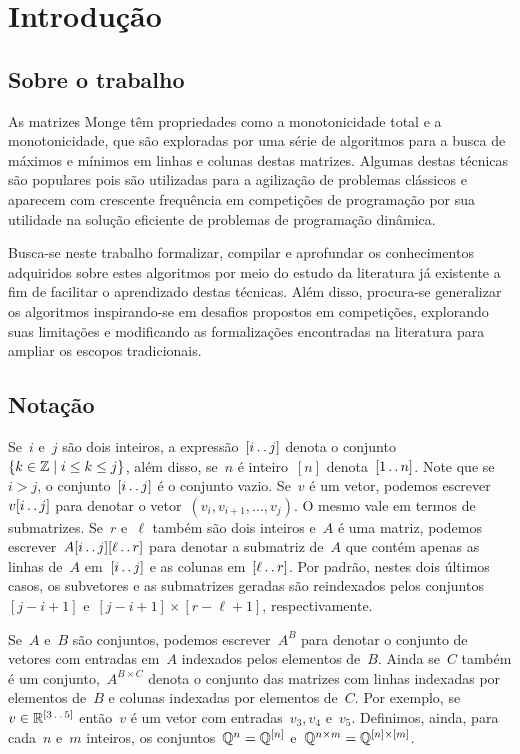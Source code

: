\section{Introdução}
\label{Introducao}

\subsection{Sobre o trabalho}
As matrizes Monge têm propriedades como a monotonicidade total e a monotonicidade, que são exploradas por uma série de algoritmos para a busca de máximos e mínimos em linhas e colunas destas matrizes. Algumas destas técnicas são populares pois são utilizadas para a agilização de problemas clássicos e aparecem com crescente frequência em competições de programação por sua utilidade na solução eficiente de problemas de programação dinâmica.

Busca-se neste trabalho formalizar, compilar e aprofundar os conhecimentos adquiridos sobre estes algoritmos por meio do estudo da literatura já existente a fim de facilitar o aprendizado destas técnicas. Além disso, procura-se generalizar os algoritmos inspirando-se em desafios propostos em competições, explorando suas limitações e modificando as formalizações encontradas na literatura para ampliar os escopos tradicionais. 

\subsection{Notação}
Se~$i$ e~$j$ são dois inteiros, a expressão~$[i \,.\,.\, j]$ denota o conjunto~${ \{ k \in \mathbb{Z} \mid i \leq k \leq j \} }$, além disso, se~$n$ é inteiro~$[n]$ denota~$[1 \,.\,.\, n]$. Note que se~$i > j$, o conjunto~$[i \,.\,.\, j]$ é o conjunto vazio. Se~$v$ é um vetor, podemos escrever~$v[i \,.\,.\, j]$ para denotar o vetor~${ (v_i, v_{i+1}, \dots, v_j) }$. O mesmo vale em termos de submatrizes. Se~$r$ e~$\ell$ também são dois inteiros e~$A$ é uma matriz, podemos escrever~$A[i \,.\,.\, j][\ell \,.\,.\, r]$ para denotar a submatriz de~$A$ que contém apenas as linhas de~$A$ em~$[i \,.\,.\, j]$ e as colunas em~$[\ell \,.\,.\, r]$. Por padrão, nestes dois últimos casos, os subvetores e as submatrizes geradas são reindexados pelos conjuntos~$[j - i + 1]$ e~${ [j - i + 1] \times [r - \ell + 1] }$, respectivamente.

Se~$A$ e~$B$ são conjuntos, podemos escrever~$A^B$ para denotar o conjunto de vetores com entradas em~$A$ indexados pelos elementos de~$B$. Ainda se~$C$ também é um conjunto,~$A^{B \times C}$ denota o conjunto das matrizes com linhas indexadas por elementos de~$B$ e colunas indexadas por elementos de~$C$. Por exemplo, se~$v \in \mathbb{R}^{ [3 \,.\,.\, 5] }$ então~$v$ é um vetor com entradas~${ v_3, v_4 }$ e~$v_5$. Definimos, ainda, para cada~$n$ e~$m$ inteiros, os conjuntos~${ \mathbb{Q}^n = \mathbb{Q}^{ [n] } }$ e~${ \mathbb{Q}^{n \times m} = \mathbb{Q}^{[n] \times [m]} }$.

